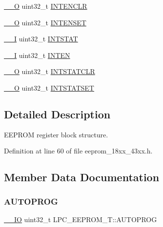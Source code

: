 \begin{DoxyCompactItemize}
\item 
\hyperlink{core__sc300_8h_a7e25d9380f9ef903923964322e71f2f6}{\+\_\+\+\_\+O} uint32\+\_\+t \hyperlink{struct_l_p_c___e_e_p_r_o_m___t_a53714bfc4f35214d6b9f87679a885919}{I\+N\+T\+E\+N\+C\+LR}
\item 
\hyperlink{core__sc300_8h_a7e25d9380f9ef903923964322e71f2f6}{\+\_\+\+\_\+O} uint32\+\_\+t \hyperlink{struct_l_p_c___e_e_p_r_o_m___t_a68289dc0a24b5186cc203d00b3c9cf68}{I\+N\+T\+E\+N\+S\+ET}
\item 
\hyperlink{core__sc300_8h_af63697ed9952cc71e1225efe205f6cd3}{\+\_\+\+\_\+I} uint32\+\_\+t \hyperlink{struct_l_p_c___e_e_p_r_o_m___t_a3e8dfb5370df75c1723945f6df9cbfb1}{I\+N\+T\+S\+T\+AT}
\item 
\hyperlink{core__sc300_8h_af63697ed9952cc71e1225efe205f6cd3}{\+\_\+\+\_\+I} uint32\+\_\+t \hyperlink{struct_l_p_c___e_e_p_r_o_m___t_a6364196d8d0c7c9ab756c2e36415c635}{I\+N\+T\+EN}
\item 
\hyperlink{core__sc300_8h_a7e25d9380f9ef903923964322e71f2f6}{\+\_\+\+\_\+O} uint32\+\_\+t \hyperlink{struct_l_p_c___e_e_p_r_o_m___t_a06fbe6ee5f70bb31317b3f54d736ccdc}{I\+N\+T\+S\+T\+A\+T\+C\+LR}
\item 
\hyperlink{core__sc300_8h_a7e25d9380f9ef903923964322e71f2f6}{\+\_\+\+\_\+O} uint32\+\_\+t \hyperlink{struct_l_p_c___e_e_p_r_o_m___t_a97050b69bb6f28ed0464b12f16b17daa}{I\+N\+T\+S\+T\+A\+T\+S\+ET}
\end{DoxyCompactItemize}


\subsection{Detailed Description}
E\+E\+P\+R\+OM register block structure. 

Definition at line 60 of file eeprom\+\_\+18xx\+\_\+43xx.\+h.



\subsection{Member Data Documentation}
\mbox{\label{struct_l_p_c___e_e_p_r_o_m___t_a2d801a9373a234be9989b0138d072ae2}} 
\subsubsection{\texorpdfstring{A\+U\+T\+O\+P\+R\+OG}{AUTOPROG}}
{\footnotesize\ttfamily \hyperlink{core__sc300_8h_aec43007d9998a0a0e01faede4133d6be}{\+\_\+\+\_\+\+IO} uint32\+\_\+t L\+P\+C\+\_\+\+E\+E\+P\+R\+O\+M\+\_\+\+T\+::\+A\+U\+T\+O\+P\+R\+OG}

